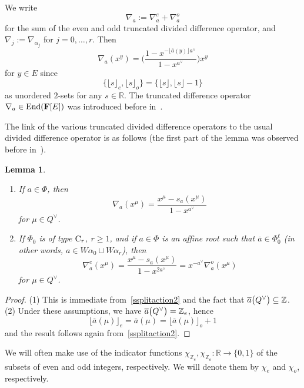 \documentclass[11pt]{article}
\numberwithin{equation}{section}
\numberwithin{equation}{section}
\newtheorem{Lemma}[Theorem]{Lemma}
\begin{document}
We write
\begin{equation}\label{Aisum}
\nabla_a:=\nabla_a^e+\nabla_a^o
\end{equation}
for the sum of the even and odd truncated divided difference operator, and $\nabla_j:=\nabla_{\alpha_j}$ for $j=0,\dots,r$. Then
\begin{equation}\label{Aires}
\nabla_a(x^y)=\Biggl(\frac{1-x^{-\lfloor\overline{a}(y)\rfloor a^\vee}}{1-x^{a^\vee}}\Biggr)x^y
\end{equation}
for $y\in E$ since
\begin{equation*}%
\{\lfloor s\rfloor_e,\lfloor s\rfloor_o\}=\{\lfloor s\rfloor,\lfloor s\rfloor-1\}
\end{equation*}
as unordered $2$-sets for any $s\in\mathbb{R}$.
The truncated difference operator $\nabla_a\in\textup{End}(\mathbf{F}[E])$ was introduced before in~\cite[Section~4.2]{SSV2}.

The link of the various truncated divided difference operators to the usual divided difference operator is as follows (the first part of the lemma was observed before in~\cite[Lemma~4.4]{SSV2}).
\begin{Lemma}\label{polredNabla}
\hfill
\begin{enumerate}\itemsep=0pt
\item[$(1)$] If $a\in\Phi$, then
\[
\nabla_a(x^\mu)=\frac{x^\mu-s_a(x^{\mu})}{1-x^{a^\vee}}
\]
for $\mu\in Q^\vee$.
\item[$(2)$] If $\Phi_0$ is of type ${\rm C}_r$, $r\geq 1$, and if $a\in\Phi$ is an affine root such that $\overline{a}\in\Phi_0^\ell$ \textup{(}in other words,
$a\in W\alpha_0\sqcup W\alpha_r$\textup{)},
then
\[
\nabla_a^e(x^\mu)=\frac{x^\mu-s_a(x^{\mu})}{1-x^{2a^\vee}}=x^{-a^\vee}\nabla_a^o(x^\mu)
\]
for $\mu\in Q^\vee$.
\end{enumerate}
\end{Lemma}
\begin{proof}
(1) This is immediate from~\eqref{ssplitaction2} and the fact that $\overline{a}\smash{\bigl(Q^\vee\bigr)}\subseteq\mathbb{Z}$.\\
(2)
Under these assumptions, we have $\overline{a}\smash{\bigl(Q^\vee\bigr)}=\mathbb{Z}_e$, hence
\[
\lfloor \overline{a}(\mu)\rfloor_e=\overline{a}(\mu)=\lfloor \overline{a}(\mu)\rfloor_o+1
\]
and the result follows again from~\eqref{ssplitaction2}.
\end{proof}

We will often make use of the indicator functions $\chi_{\mathbb{Z}_e}, \chi_{\mathbb{Z}_o}\colon \mathbb{R}\rightarrow\{0,1\}$ of the
subsets of even and odd integers, respectively. We will denote them by $\chi_e$ and $\chi_o$, respectively.
\end{document}
